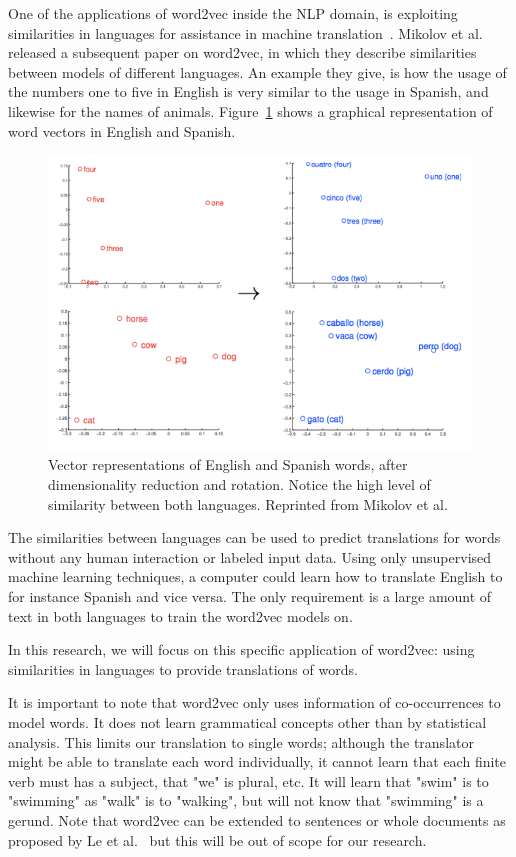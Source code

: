 One of the applications of word2vec inside the NLP domain, is exploiting similarities in languages for assistance in machine translation~\cite{wolf2014joint}. Mikolov et al.~\cite{mikolov2013exploiting} released a subsequent paper on word2vec, in which they describe similarities between models of different languages. An example they give, is how the usage of the numbers one to five in English is very similar to the usage in Spanish, and likewise for the names of animals. Figure~\ref{fig:english_spanish} shows a graphical representation of word vectors in English and Spanish.

\begin{figure}[ht!]
  \centering \includegraphics[width=\linewidth]{images/english_spanish}
  \caption{Vector representations of English and Spanish words, after dimensionality reduction and rotation. Notice the high level of similarity between both languages. Reprinted from Mikolov et al.~\cite{mikolov2013exploiting}}
  \label{fig:english_spanish}
\end{figure}

The similarities between languages can be used to predict translations for words without any human interaction or labeled input data. Using only unsupervised machine learning techniques, a computer could learn how to translate English to for instance Spanish and vice versa. The only requirement is a large amount of text in both languages to train the word2vec models on.

In this research, we will focus on this specific application of word2vec: using similarities in languages to provide translations of words.

It is important to note that word2vec only uses information of co-occurrences to model words. It does not learn grammatical concepts other than by statistical analysis. This limits our translation to single words; although the translator might be able to translate each word individually, it cannot learn that each finite verb must has a subject, that "we" is plural, etc. It will learn that "swim" is to "swimming" as "walk" is to "walking", but will not know that "swimming" is a gerund. Note that word2vec can be extended to sentences or whole documents as proposed by Le et al.~\cite{le2014distributed} but this will be out of scope for our research.


